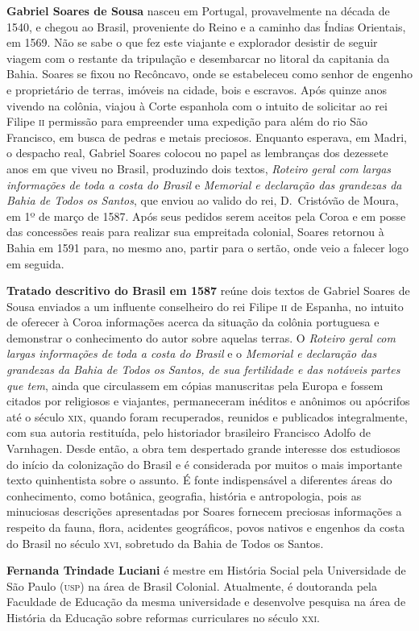 
\textbf{Gabriel Soares de Sousa} nasceu em Portugal, provavelmente na
década de 1540, e chegou ao Brasil, proveniente do Reino e a caminho das
Índias Orientais, em 1569. Não se sabe o que fez este viajante e
explorador desistir de seguir viagem com o restante da tripulação e
desembarcar no litoral da capitania da Bahia. Soares se fixou no
Recôncavo, onde se estabeleceu como senhor de engenho e proprietário
de terras, imóveis na cidade, bois e escravos. Após quinze anos vivendo
na colônia, viajou à Corte espanhola com o intuito de solicitar ao rei
Filipe \textsc{ii} permissão para empreender uma expedição para além do rio São
Francisco, em busca de pedras e metais preciosos. Enquanto esperava, em
Madri, o despacho real, Gabriel Soares colocou no papel as lembranças
dos dezessete anos em que viveu no Brasil, produzindo dois
textos, \textit{Roteiro geral com largas informações de toda a costa do
Brasil} e \textit{Memorial e declaração das grandezas da Bahia de Todos
os Santos}, que enviou ao valido do rei, D.~Cristóvão de Moura, em 1º
de março de 1587. Após seus pedidos serem aceitos pela Coroa e em posse
das concessões reais para realizar sua empreitada colonial, Soares
retornou à Bahia em 1591 para, no mesmo ano, partir para o sertão, onde
veio a falecer logo em seguida.
     
\textbf{Tratado descritivo do Brasil em 1587} reúne dois textos de
Gabriel Soares de Sousa enviados a um influente conselheiro do rei
Filipe \textsc{ii} de Espanha, no intuito de oferecer à Coroa informações acerca
da situação da colônia portuguesa e demonstrar o conhecimento do autor
sobre aquelas terras.  O \textit{Roteiro geral com largas informações
de toda a costa do Brasil} e o \textit{Memorial e declaração das
grandezas da Bahia de Todos os Santos, de sua fertilidade e das
notáveis partes que tem}, ainda que circulassem em cópias manuscritas
pela Europa e fossem citados por religiosos e viajantes, permaneceram
inéditos e anônimos ou apócrifos até o século \textsc{xix}, quando foram
recuperados, reunidos e publicados integralmente, com sua autoria
restituída, pelo historiador brasileiro Francisco Adolfo de Varnhagen.
Desde então, a obra tem despertado grande interesse dos estudiosos do
início da colonização do Brasil e é considerada por muitos o mais
importante texto quinhentista sobre o assunto. É fonte indispensável a
diferentes áreas do conhecimento, como botânica, geografia, história e
antropologia, pois as minuciosas descrições apresentadas por Soares
fornecem preciosas informações a respeito da fauna, flora, acidentes
geográficos, povos nativos e engenhos da costa do Brasil no
século \textsc{xvi}, sobretudo da Bahia de Todos os Santos.
  
\textbf{Fernanda Trindade Luciani} é mestre em História Social pela Universidade de São Paulo (\textsc{usp}) na área de Brasil Colonial. Atualmente, é doutoranda pela Faculdade de Educação da mesma universidade e desenvolve pesquisa na área de História da Educação sobre reformas curriculares no século \textsc{xxi}.

 
